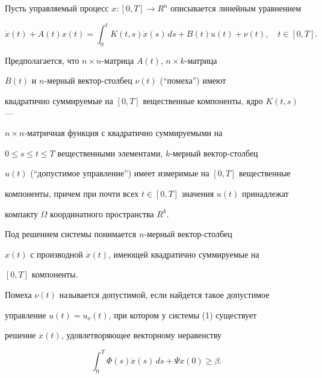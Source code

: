 \label{begin}








Пусть управляемый процесс $x:[0,T]\to R^n$ описывается линейным уравнением


\begin{equation}


\Dot x(t) + A(t)x(t) = \int_0^t K(t,s)\Dot x(s)\, ds +


B(t)u(t) + \nu(t), \quad t\in [0,T]. 


\end{equation}


Предполагается, что $n\times n$-матрица $A(t)$, $n\times k$-матрица


$B(t)$ и $n$-мерный вектор-столбец $\nu(t)$ (``помеха'') имеют


квадратично суммируемые на $[0,T]$ вещественные компоненты, ядро $K(t,s)$ ---


$n\times n$-матричная функция с квадратично суммируемыми на


$0\le s\le t\le T$ вещественными элементами, $k$-мерный вектор-столбец


$u(t)$ (``допустимое управление'') имеет измеримые на $[0,T]$ вещественные


компоненты, причем при почти всех $t\in[0,T]$ значения $u(t)$ принадлежат


компакту $\Omega$ координатного пространства $R^k$.





Под решением системы  понимается $n$-мерный вектор-столбец


$x(t)$ с производной $\Dot x(t)$, имеющей квадратично суммируемые на


$[0,T]$ компоненты.





Помеха $\nu(t)$ называется допустимой, если найдется такое допустимое


управление $u(t) = u_\nu(t)$, при котором у системы (1) существует


решение $x(t)$, удовлетворяющее векторному неравенству


\begin{equation}


\int_0^T \Phi(s)\Dot x(s)\,ds + \Psi x(0) \ge \beta. 


\end{equation}


